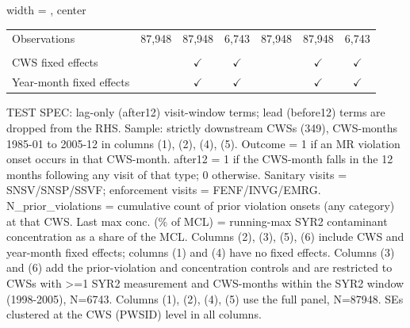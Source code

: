\begin{table}[htbp]
\begin{adjustbox}{width = \textwidth, center}
\begin{tabular}{lcccccc}
          \\
         
         Observations                           & 87,948         & 87,948        & 6,743         & 87,948         & 87,948        & 6,743\\  
         
          \\
         
         CWS fixed effects                      &                & $\checkmark$  & $\checkmark$  &                & $\checkmark$  & $\checkmark$\\   
         Year-month fixed effects               &                & $\checkmark$  & $\checkmark$  &                & $\checkmark$  & $\checkmark$\\   
         
         \bottomrule
         
      \end{tabular}
      
      
      
   \end{adjustbox}
      {\tiny\linespread{1}\selectfont \par \raggedright 
   TEST SPEC: lag-only (after12) visit-window terms; lead (before12) terms are dropped from the RHS. Sample: strictly downstream CWSs (349), CWS-months 1985-01 to 2005-12 in columns (1), (2), (4), (5). Outcome = 1 if an MR violation onset occurs in that CWS-month. after12 = 1 if the CWS-month falls in the 12 months following any visit of that type; 0 otherwise. Sanitary visits = SNSV/SNSP/SSVF; enforcement visits = FENF/INVG/EMRG. N\_prior\_violations = cumulative count of prior violation onsets (any category) at that CWS. Last max conc. (\% of MCL) = running-max SYR2 contaminant concentration as a share of the MCL. Columns (2), (3), (5), (6) include CWS and year-month fixed effects; columns (1) and (4) have no fixed effects. Columns (3) and (6) add the prior-violation and concentration controls and are restricted to CWSs with >=1 SYR2 measurement and CWS-months within the SYR2 window (1998-2005), N=6743. Columns (1), (2), (4), (5) use the full panel, N=87948. SEs clustered at the CWS (PWSID) level in all columns.}
   
\end{table}


